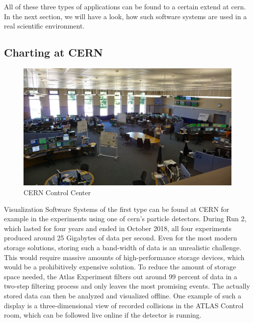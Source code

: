 All of these three types of applications can be found to a certain extend at
\gls{cern}. In the next section, we will have a look, how such software systems
are used in a real scientific environment.



\subsection{Charting at CERN}
\label{sec:fundamentals:cerncharting}

\begin{figure}[h]
    \centering
    \includegraphics[width=14cm]{resources/img/CernControlCenter}
    \caption{CERN Control Center}
    \label{fig:ccc}
\end{figure}

Visualization Software Systems of the first type can be found at CERN for
example in the experiments using one of \gls{cern}'s particle detectors. During
Run 2, which lasted for four years and ended in October 2018, all four
experiments produced around 25 Gigabytes of data per second. Even for the most
modern storage solutions, storing such a band-width of data is an unrealistic
challenge. This would require massive amounts of high-performance storage
devices, which would be a prohibitively expensive solution. To reduce the amount
of storage space needed, the Atlas Experiment filters out around 99 percent of
data in a two-step filtering process and only leaves the most promising events.
The actually stored data can then be analyzed and visualized offline. One
example of such a display is a three-dimensional view of recorded collisions in
the ATLAS Control room, which can be followed live online if the detector is
running.
\cite{LhcDataStorage, LhcRun2, AtlasLiveCollisions, AtlasTrigger}

